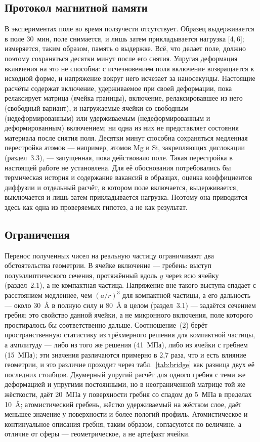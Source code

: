 \subsection{Протокол магнитной памяти}

В экспериментах поле во время ползучести отсутствует. Образец выдерживается в
поле 30~мин, поле снимается, и лишь затем прикладывается нагрузка [4,\,6];
измеряется, таким образом, память о выдержке.
Всё, что делает поле, должно поэтому сохраняться десятки минут после его
снятия. Упругая деформация включения на это не способна: с исчезновением поля
включение возвращается к исходной форме, и напряжение вокруг него исчезает за
наносекунды. Настоящие расчёты содержат включение, удерживаемое при своей деформации,
пока релаксирует матрица (ячейка границы), включение, релаксировавшее из
него (свободный вариант), и нагружаемые ячейки со свободным (недеформированным) или удерживаемым
(недеформированным и деформированным) включением; ни одна из них не представляет состояния
материала после снятия поля. Десятки минут
способна сохраняться медленная перестройка атомов --- например, атомов Mg и
Si, закрепляющих дислокации (раздел~3.3), --- запущенная, пока действовало
поле. Такая перестройка в настоящей работе не установлена. Для её обоснования
потребовались бы термическая история и содержание вакансий в образцах, оценка
коэффициентов диффузии и отдельный расчёт, в котором поле включается,
выдерживается, выключается и лишь затем прикладывается нагрузка. Поэтому она
приводится здесь как одна из проверяемых гипотез, а не как результат.

\subsection{Ограничения}

Перенос полученных чисел на реальную частицу ограничивают два обстоятельства
геометрии. В ячейке включение --- гребень: выступ полуэллиптического сечения,
протяжённый вдоль $y$ через всю ячейку (раздел~2.1), а не компактная частица.
Напряжение вне такого выступа спадает с расстоянием медленнее, чем
$(a/r)^{3}$ для компактной частицы, а его дальность --- около 30~\AA{} в полную силу и 80~\AA{} в целом
(раздел~3.1) --- задаётся сечением гребня: это свойство данной ячейки, а не микронного включения, поле
которого простиралось бы соответственно дальше. Соотношение~(2) берёт
пространственную статистику из трёхмерного решения для компактной частицы, а
амплитуду --- либо из того же решения (41~МПа), либо из ячейки с гребнем
(15~МПа); эти значения различаются примерно в
2{,}7 раза, что и есть влияние геометрии, и это различие
проходит через табл.~\ref{tab:bridge} как разница двух её последних
столбцов. Двумерный упругий расчёт для одного гребня с теми же деформацией и
упругими постоянными, но в неограниченной матрице той же жёсткости, даёт
20~МПа у поверхности гребня со спадом до 5~МПа в пределах
10~\AA{}; атомистический гребень, жёстко удерживаемый на жёстком слое, даёт
меньшее значение у поверхности и более пологий профиль. Атомистическое и
континуальное описания гребня, таким образом, согласуются по величине, а
отличие от сферы --- геометрическое, а не артефакт ячейки.

